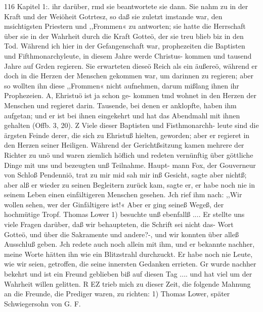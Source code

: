 116 Kapitel 1:.
ihr darüber, rmd sie beantwortete sie dann. Sie nahm zu in der
Kraft und der Weiöheit Gotrtesz, so daß sie zuletzt imstande war,
den msichtigsten Priestern und ,,Frommen« zu antworten; sie hatte
die Herrschaft über sie in der Wahrheit durch die Kraft Gotteö,
der sie treu blieb biz in den Tod.
Während ich hier in der Gefangenschaft war, prophezeiten
die Baptisten und Fifthmonarchyleute, in diesem Jahre werde
Christus- kommen und tausend Jahre auf Grden regieren. Sie
erwarteten dieseö Reich als ein äußereö, während er doch in die
Herzen der Menschen gekommen war, um darinnen zu regieren;
aber so wollten ihn diese ,,Frommen« nicht aufnehmen, darum
mißlang ihnen ihr Prophezeien. A, Ehristuö ist ja schon ge-
kommen tmd wohnet in den Herzen der Menschen und regieret
darin. Tausende, bei denen er anklopfte, haben ihm aufgetan;
und er ist bei ihnen eingekehrt und hat das Abendmahl mit ihnen
gehalten (Offb. 3, 20). Z Viele dieser Baptisten und Fisthmonarchh-
leute sind die ärgsten Feinde derer, die sich zu Ehristuß hielten,
geworden; aber er regieret in den Herzen seiner Heiligen.
Während der Gerichtßsitzung kamen mehrere der Richter zu
unö und waren ziemlich höflich und redeten vernünftig über
göttliche Dinge mit uns und bezeugten unß Teilnahme. Haupt-
mann Fox, der Gouverneur von Schloß Pendenniö, trat zu mir
mid sah mir inß Gesicht, sagte aber nichtß; aber alß er wieder
zu seinen Begleitern zurück kam, sagte er, er habe noch nie in
seinem Leben einen einfältigeren Menschen gesehen. Jch rief ihm
nach: ,,Wir wollen sehen, wer der Ginfältigere ist!« Aber er
ging seineß Wegeß, der hochmütige Tropf.
Thomas Lower 1) besuchte unß ebenfallß .... Er stellte uns
viele Fragen darüber, daß wir behaupteten, die Schrift sei nicht
das- Wort Gotteö, und über die Sakramente und andere?-, und
wir konnten über alleß Ausschluß geben. Jch redete auch noch
allein mit ihm, und er bekannte nachher, meine Worte hätten
ihn wie ein Blitzstrahl durchzuckt. Er habe noch nie Leute, wie
wir seien, getroffen, die seine innersten Gedanken errieten. Gr
wurde nachher bekehrt und ist ein Freund geblieben biß auf diesen
Tag .... und hat viel um der Wahrheit willen gelitten. R
EZ trieb mich zu dieser Zeit, die folgende Mahnung an die
Freunde, die Prediger waren, zu richten:
1) Thomas Lower, später Schwiegersohn von G. F.



